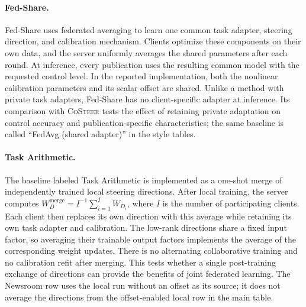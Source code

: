 \documentclass[11pt]{article}
\newcommand{\costeer}{\textsc{CoSteer}}
\begin{document}
\paragraph{Fed-Share.}
Fed-Share uses federated averaging to learn one common task adapter, steering direction, and calibration mechanism. Clients optimize these components on their own data, and the server uniformly averages the shared parameters after each round. At inference, every publication uses the resulting common model with the requested control level. In the reported implementation, both the nonlinear calibration parameters and its scalar offset are shared. Unlike a method with private task adapters, Fed-Share has no client-specific adapter at inference. Its comparison with \costeer{} tests the effect of retaining private adaptation on control accuracy and publication-specific characteristics; the same baseline is called ``FedAvg (shared adapter)'' in the style tables.

\paragraph{Task Arithmetic.}
The baseline labeled Task Arithmetic is implemented as a one-shot merge of independently trained local steering directions. After local training, the server computes $W_D^{\mathrm{merge}}=I^{-1}\sum_{i=1}^{I}W_{D_i}$, where $I$ is the number of participating clients. Each client then replaces its own direction with this average while retaining its own task adapter and calibration. The low-rank directions share a fixed input factor, so averaging their trainable output factors implements the average of the corresponding weight updates. There is no alternating collaborative training and no calibration refit after merging. This tests whether a single post-training exchange of directions can provide the benefits of joint federated learning. The Newsroom row uses the local run without an offset as its source; it does not average the directions from the offset-enabled local row in the main table.
\end{document}
